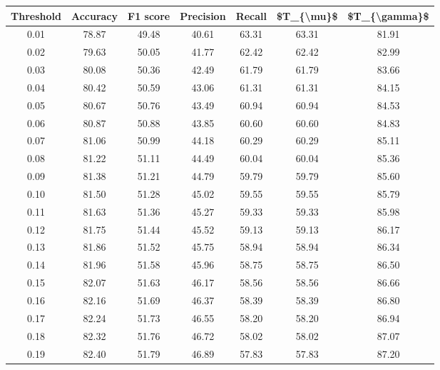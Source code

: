 \begin{tabular}{|c|c|c|c|c|c|c|}
\hline
 Threshold &  Accuracy &  F1 score &  Precision &  Recall &  \$T\_\{\textbackslash mu\}\$ &  \$T\_\{\textbackslash gamma\}\$ \\
\hline
      0.01 &     78.87 &     49.48 &      40.61 &   63.31 &      63.31 &         81.91 \\
      0.02 &     79.63 &     50.05 &      41.77 &   62.42 &      62.42 &         82.99 \\
      0.03 &     80.08 &     50.36 &      42.49 &   61.79 &      61.79 &         83.66 \\
      0.04 &     80.42 &     50.59 &      43.06 &   61.31 &      61.31 &         84.15 \\
      0.05 &     80.67 &     50.76 &      43.49 &   60.94 &      60.94 &         84.53 \\
      0.06 &     80.87 &     50.88 &      43.85 &   60.60 &      60.60 &         84.83 \\
      0.07 &     81.06 &     50.99 &      44.18 &   60.29 &      60.29 &         85.11 \\
      0.08 &     81.22 &     51.11 &      44.49 &   60.04 &      60.04 &         85.36 \\
      0.09 &     81.38 &     51.21 &      44.79 &   59.79 &      59.79 &         85.60 \\
      0.10 &     81.50 &     51.28 &      45.02 &   59.55 &      59.55 &         85.79 \\
      0.11 &     81.63 &     51.36 &      45.27 &   59.33 &      59.33 &         85.98 \\
      0.12 &     81.75 &     51.44 &      45.52 &   59.13 &      59.13 &         86.17 \\
      0.13 &     81.86 &     51.52 &      45.75 &   58.94 &      58.94 &         86.34 \\
      0.14 &     81.96 &     51.58 &      45.96 &   58.75 &      58.75 &         86.50 \\
      0.15 &     82.07 &     51.63 &      46.17 &   58.56 &      58.56 &         86.66 \\
      0.16 &     82.16 &     51.69 &      46.37 &   58.39 &      58.39 &         86.80 \\
      0.17 &     82.24 &     51.73 &      46.55 &   58.20 &      58.20 &         86.94 \\
      0.18 &     82.32 &     51.76 &      46.72 &   58.02 &      58.02 &         87.07 \\
      0.19 &     82.40 &     51.79 &      46.89 &   57.83 &      57.83 &         87.20 \\

\end{tabular}
